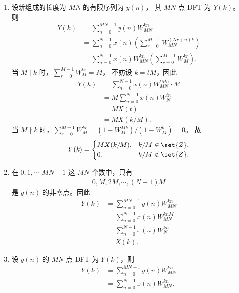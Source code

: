 \begin{solution}
    \begin{enumerate}[label=(\arabic*)]
        \item 设新组成的长度为 $MN$ 的有限序列为 $y(n)$，
            其 $MN$ 点 DFT 为 $Y(k)$。则
            \begin{align*}
                Y(k) & = \sum_{n = 0}^{MN - 1}y(n)W_{MN}^{kn} \\
                & = \sum_{n = 0}^{N - 1}x(n)\left(\sum_{r = 0}^{M - 1}W_{MN}^{(Nr + n)k}\right) \\
                & = \sum_{n = 0}^{N - 1}x(n)W_{MN}^{kn}\left(\sum_{r = 0}^{M - 1}W_M^{kr}\right).
            \end{align*}
            当 $M \mid k$ 时，$\sum_{r = 0}^{M - 1}W_M^{kr} = M$，
            不妨设 $k = tM$，因此
            \begin{align*}
                Y(k) & = \sum_{n = 0}^{N - 1}x(n)W_{MN}^{tMn} \cdot M \\
                & = M\sum_{n = 0}^{N - 1}x(n)W_N^{tn} \\
                & = MX(t) \\
                & = MX(k / M).
            \end{align*}
            当 $M \nmid k$ 时，$\sum_{r = 0}^{M - 1}W_M^{kr} = (1 - W_M^{Mk})/(1 - W_M^k) = 0$。
            故
            \begin{align*}
                Y(k) = \begin{cases}
                    MX(k / M), & k / M \in \set{Z}, \\
                    0, & k / M \notin \set{Z}.
                \end{cases}
            \end{align*}
        \item 在 $0, 1, \cdots, MN - 1$ 这 $MN$ 个数中，只有
            \begin{align*}
                0, M, 2M, \cdots, (N - 1)M
            \end{align*}
            是 $y(n)$ 的非零点。因此
            \begin{align*}
                Y(k) & = \sum_{n = 0}^{MN - 1}y(n)W_{MN}^{kn} \\
                & = \sum_{n = 0}^{N - 1}x(n)W_{MN}^{knM} \\
                & = \sum_{n = 0}^{N - 1}x(n)W_N^{kn} \\
                & = X(k).
            \end{align*}
        \item 设 $y(n)$ 的 $MN$ 点 DFT 为 $Y(k)$，则
            \begin{align*}
                Y(k) & = \sum_{n = 0}^{MN - 1}y(n)W_{MN}^{kn} \\
                & = \sum_{n = 0}^{N - 1}x(n)W_{MN}^{kn}.
            \end{align*}


\end{enumerate}
\end{solution}
